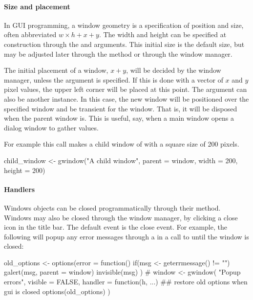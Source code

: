 \paragraph{Size and placement}
In GUI programming, a window geometry is a specification of position
and size, often abbreviated $w \times h + x + y$. The width and height
can be specified at construction through the 
and  arguments. This initial size is the
default size, but may be adjusted later through the
 method or through the window manager. 

The initial placement of a window, $x+y$, will be decided by the
window manager, unless the  argument is
specified. If this is done with a vector of $x$ and $y$ pixel values,
the upper left corner will be placed at this point. The 
argument can also be another  instance. In this case,
the new window will be positioned over the specified window and be
transient for the window. That is, it will be disposed when the parent
window is. This is useful, say, when a main window opens a dialog
window to gather values.

For example this call makes a child window of  with a square
size of 200 pixels.
\begin{Schunk}
\begin{Sinput}
 child_window <- gwindow("A child window", parent = window, 
                         width = 200, height = 200)
\end{Sinput}
\end{Schunk}


\paragraph{Handlers}
Windows objects can be closed programmatically through their
 method. Windows may also be closed through
the window manager, by clicking a close icon in the title bar. The
default event is the close event. For example, the following will
popup any error messages through a in a call to  until
the window is closed:

\begin{Schunk}
\begin{Sinput}
 old_options <- options(error = function() {
   if(msg <- geterrmessage() != "")
     galert(msg, parent = window)
   invisible(msg)
 })
 #
 window <- gwindow( "Popup errors", visible = FALSE,
                   handler = function(h, ...) {
                     ## restore old options when gui is closed
                     options(old_options)       
                   })
\end{Sinput}
\end{Schunk}

